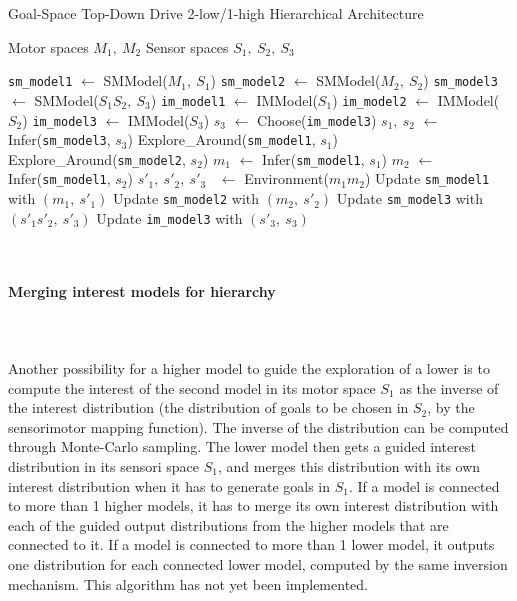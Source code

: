 \documentclass[12pt]{article}
\begin{document}
			\begin{algorithm}[H]
				\caption{Goal-Space Top-Down Drive 2-low/1-high Hierarchical Architecture}
				\label{algotdd21}
				\begin{algorithmic}[1]
					\Require Motor spaces $M_1,~M_2$
					\Require Sensor spaces $S_1,~S_2,~S_3$
					
					\State \texttt{sm\_model1} $\gets$ SMModel($M_1,~S_1$)
					\State \texttt{sm\_model2} $\gets$ SMModel($M_2,~S_2$)
					\State \texttt{sm\_model3} $\gets$ SMModel($S_1S_2,~S_3$)
					\State \texttt{im\_model1} $\gets$ IMModel($S_1$)
					\State \texttt{im\_model2} $\gets$ IMModel($S_2$)
					\State \texttt{im\_model3} $\gets$ IMModel($S_3$)
					\Loop
						\State $s_3$ $\gets$ Choose(\texttt{im\_model3})
						\State $s_1,~s_2$ $\gets$ Infer(\texttt{sm\_model3}, $s_3$)
						\State Explore\_Around(\texttt{sm\_model1}, $s_1$)
						\State Explore\_Around(\texttt{sm\_model2}, $s_2$)
						\State $m_1$ $\gets$ Infer(\texttt{sm\_model1}, $s_1$)
						\State $m_2$ $\gets$ Infer(\texttt{sm\_model1}, $s_2$)
						\State $s'_1,~s'_2,~s'_3$~ $\gets$ Environment($m_1m_2$)
						\State Update \texttt{sm\_model1} with $(m_1,~s'_1)$
						\State Update \texttt{sm\_model2} with $(m_2,~s'_2)$
						\State Update \texttt{sm\_model3} with $(s'_1s'_2,~s'_3)$
						\State Update \texttt{im\_model3} with $(s'_3,~s_3)$
					\EndLoop
				\end{algorithmic}
			\end{algorithm}
			
			~\\
			\paragraph{Merging interest models for hierarchy}~\\
			\paragraph{}
			Another possibility for a higher model to guide the exploration of a lower is to compute the interest of the second model
			in its motor space $S_1$ as the inverse of the interest distribution (the distribution of goals to be chosen in $S_2$, by the sensorimotor mapping function). 
			The inverse of the distribution can be computed through Monte-Carlo sampling.
			The lower model then gets a guided interest distribution in its sensori space $S_1$, and merges this distribution with its own interest 
			distribution when it has to generate goals in $S_1$. 
			If a model is connected to more than 1 higher models, it has to merge its own interest distribution with each of the guided output distributions from the higher models that are connected to it.
			If a model is connected to more than 1 lower model, it outputs one distribution for each connected lower model, computed by the same inversion mechanism.
			This algorithm has not yet been implemented.
			
\end{document}
